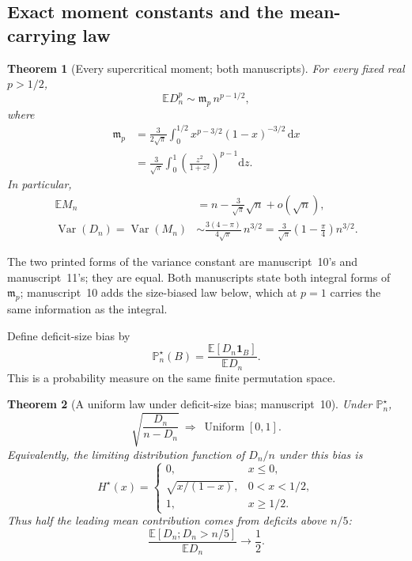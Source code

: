 \documentclass[11pt,a4paper]{article}
\newtheorem{theorem}{Theorem}[section]
\theoremstyle{definition}\newaliascnt{definition}{theorem}
\theoremstyle{remark}\newaliascnt{remark}{theorem}
\newcommand{\one}{\mathbf 1}
\newcommand{\dd}{\mathrm d}
\newcommand{\ljP}{\mathbb P}
\newcommand{\ljE}{\mathbb E}
\newcommand{\mjVar}{\operatorname{Var}}
\begin{document}
\subsection{Exact moment constants and the mean-carrying law}
\begin{theorem}[Every supercritical moment; both manuscripts]
\label{mj:thm:moments}
For every fixed real $p>1/2$,
\begin{equation}
 \ljE D_n^p\sim\mathfrak m_p\, n^{p-1/2},
 \label{mj:eq:moment-equivalent}
\end{equation}
where
\begin{align}
 \mathfrak m_p
 &=\frac3{2\sqrt\pi}\int_0^{1/2}
          x^{p-3/2}(1-x)^{-3/2}\,\dd x\label{mj:eq:kappa-beta}\\
 &=\frac3{\sqrt\pi}\int_0^1
       \left(\frac{z^2}{1+z^2}\right)^{p-1}\dd z.
 \label{mj:eq:kappa-t}
\end{align}
In particular,
\begin{align}
 \ljE M_n&=n-\frac3{\sqrt\pi}\sqrt n+o(\sqrt n),
 \label{mj:eq:mean-M}\\
 \mjVar(D_n)=\mjVar(M_n)
 &\sim\frac{3(4-\pi)}{4\sqrt\pi}\,n^{3/2}
  =\frac3{\sqrt\pi}\left(1-\frac\pi4\right)n^{3/2}.
 \label{mj:eq:variance}
\end{align}
\end{theorem}

The two printed forms of the variance constant are manuscript~10's and
manuscript~11's; they are equal. Both manuscripts state both integral forms
of $\mathfrak m_p$; manuscript~10 adds the size-biased law below, which at
$p=1$ carries the same information as the integral.

Define deficit-size bias by
\begin{equation}
 \ljP_n^\star(B)=\frac{\ljE[D_n\one_B]}{\ljE D_n}.
 \label{mj:eq:size-bias}
\end{equation}
This is a probability measure on the same finite permutation space.

\begin{theorem}[A uniform law under deficit-size bias; manuscript~10]
\label{mj:thm:uniform}
Under $\ljP_n^\star$,
\begin{equation}
 \sqrt{\frac{D_n}{n-D_n}}\ \Longrightarrow\ \operatorname{Uniform}[0,1].
 \label{mj:eq:uniform-law}
\end{equation}
Equivalently, the limiting distribution function of $D_n/n$ under this
bias is
\begin{equation}
 H^\star(x)=
 \begin{cases}
 0,&x\le0,\\
 \sqrt{x/(1-x)},&0<x<1/2,\\
 1,&x\ge1/2.
 \end{cases}
 \label{mj:eq:mean-cdf}
\end{equation}
Thus half the leading mean contribution comes from deficits above $n/5$:
\begin{equation}
 \frac{\ljE[D_n;D_n>n/5]}{\ljE D_n}\longrightarrow\frac12.
 \label{mj:eq:half-mean}
\end{equation}
\end{theorem}
\end{document}
